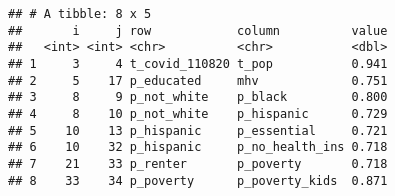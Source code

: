 \documentclass[
]{article}
\newenvironment{Shaded}{\begin{snugshade}}{\end{snugshade}}
\newcommand{\DecValTok}[1]{\textcolor[rgb]{0.00,0.00,0.81}{#1}}
\newcommand{\FloatTok}[1]{\textcolor[rgb]{0.00,0.00,0.81}{#1}}
\newcommand{\KeywordTok}[1]{\textcolor[rgb]{0.13,0.29,0.53}{\textbf{#1}}}
\newcommand{\NormalTok}[1]{#1}
\newcommand{\OperatorTok}[1]{\textcolor[rgb]{0.81,0.36,0.00}{\textbf{#1}}}
\newcommand{\StringTok}[1]{\textcolor[rgb]{0.31,0.60,0.02}{#1}}
\begin{document}
\begin{Shaded}
\end{Shaded}

\begin{Shaded}
\end{Shaded}

\begin{verbatim}
## # A tibble: 8 x 5
##       i     j row            column          value
##   <int> <int> <chr>          <chr>           <dbl>
## 1     3     4 t_covid_110820 t_pop           0.941
## 2     5    17 p_educated     mhv             0.751
## 3     8     9 p_not_white    p_black         0.800
## 4     8    10 p_not_white    p_hispanic      0.729
## 5    10    13 p_hispanic     p_essential     0.721
## 6    10    32 p_hispanic     p_no_health_ins 0.718
## 7    21    33 p_renter       p_poverty       0.718
## 8    33    34 p_poverty      p_poverty_kids  0.871
\end{verbatim}

\begin{Shaded}
\end{Shaded}
\end{document}

